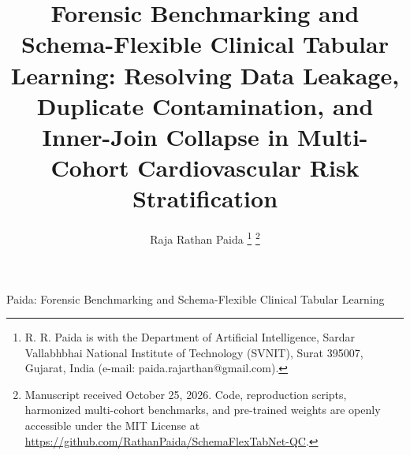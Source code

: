 \documentclass[journal]{IEEEtran}
\begin{document}
\title{Forensic Benchmarking and Schema-Flexible Clinical Tabular Learning: Resolving Data Leakage, Duplicate Contamination, and Inner-Join Collapse in Multi-Cohort Cardiovascular Risk Stratification}

\author{Raja Rathan Paida
\thanks{R. R. Paida is with the Department of Artificial Intelligence, Sardar Vallabhbhai National Institute of Technology (SVNIT), Surat 395007, Gujarat, India (e-mail: paida.rajarthan@gmail.com).}
\thanks{Manuscript received October 25, 2026. Code, reproduction scripts, harmonized multi-cohort benchmarks, and pre-trained weights are openly accessible under the MIT License at \url{https://github.com/RathanPaida/SchemaFlexTabNet-QC}.}
}

%
{Paida: Forensic Benchmarking and Schema-Flexible Clinical Tabular Learning}

\maketitle
\end{document}
